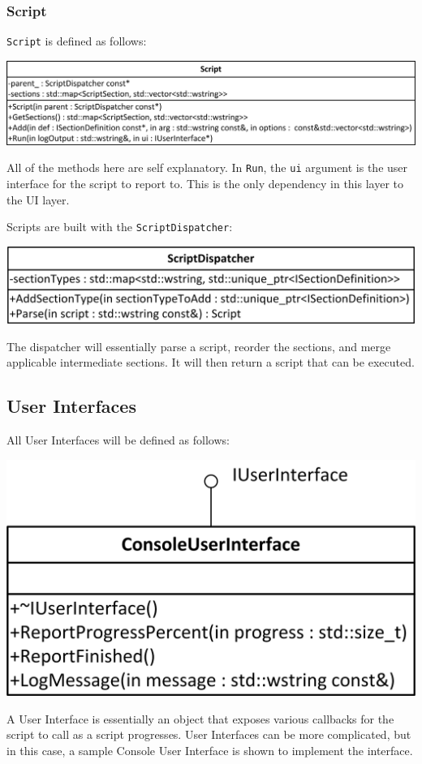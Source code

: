 \documentclass[letterpaper,12pt]{article}
\begin{document}
\subsubsection{Script}
\verb|Script| is defined as follows:
\begin{center}\includegraphics{figures/Script.png}\end{center}

All of the methods here are self explanatory.  In \verb|Run|, the \verb|ui|
argument is the user interface for the script to report to.  This is the only
dependency in this layer to the UI layer.

Scripts are built with the \verb|ScriptDispatcher|:
\begin{center}\includegraphics{figures/ScriptDispatcher.png}\end{center}
The dispatcher will essentially parse a script, reorder the sections, and merge
applicable intermediate sections.  It will then return a script that can be
executed.

\subsection{User Interfaces}
All User Interfaces will be defined as follows:
\begin{center}\includegraphics{figures/IUserInterface.png}\end{center}
A User Interface is essentially an object that exposes various callbacks for the
script to call as a script progresses.  User Interfaces can be more complicated,
but in this case, a sample Console User Interface is shown to implement the
interface.  
\end{document}
